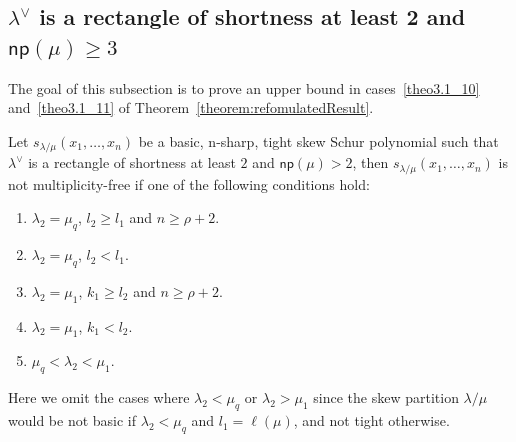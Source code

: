 \documentclass[ALCO,ThmDefs,Unicode,epreuves]{cedram}
\newcommand{\np}{\mathsf{np}}
\begin{document}
\subsection{\texorpdfstring{$\lambda^\vee$}{lambda vee} is a rectangle of shortness at least 2 and \texorpdfstring{$\np (\mu) \geq 3$}{np(mu) geq 3}}\label{sec:3.2}

The goal of this subsection is to prove an upper bound in cases~\ref{theo3.1_10} and~\ref{theo3.1_11} of Theorem~\ref{theorem:refomulatedResult}.

\begin{theorem}
\label{thm:suffnotfathook}
Let $s_{\lambda/\mu}(x_1,\ldots,x_n)$ be a basic, n-sharp, tight skew Schur polynomial such that $\lambda^\vee$ is a rectangle of shortness at least $2$ and $\np (\mu) > 2$, then $s_{\lambda/\mu}(x_1,\ldots,x_n)$ is not multiplicity-free if one of the following conditions hold:
\begin{enumerate}[label=(\Roman{*})]
 \item\label{theo3.9_1} $\lambda_2 = \mu_q$, $l_2\geq l_1$ and $n\geq \rho+2$.
 \item\label{theo3.9_2} $\lambda_2 = \mu_q$, $l_2< l_1$. 
 \item\label{theo3.9_3} $\lambda_2 = \mu_1$, $k_1\geq l_2$ and $n\geq \rho+2$.
 \item\label{theo3.9_4} $\lambda_2 = \mu_1$, $k_1< l_2$.
 \item\label{theo3.9_5} $\mu_q<\lambda_2<\mu_1$. 
\end{enumerate}
\end{theorem}

Here we omit the cases where $\lambda_2<\mu_q$ or $\lambda_2>\mu_1$ since the skew partition $\lambda/\mu$ would be not basic if $\lambda_2<\mu_q$ and $l_1 = \ell(\mu)$, and not tight otherwise. 
\end{document}
